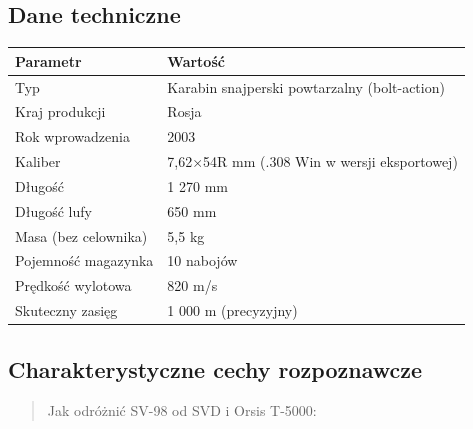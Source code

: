 \documentclass[12pt,oneside]{book}
\begin{document}
\subsection{Dane techniczne}\label{dane-techniczne-78}

\begin{longtable}[]{@{}ll@{}}
\toprule\noalign{}
Parametr & Wartość \\
\midrule\noalign{}
\endhead
\bottomrule\noalign{}
\endlastfoot
Typ & Karabin snajperski powtarzalny (bolt-action) \\
Kraj produkcji & Rosja \\
Rok wprowadzenia & 2003 \\
Kaliber & 7,62×54R mm (.308 Win w wersji eksportowej) \\
Długość & 1 270 mm \\
Długość lufy & 650 mm \\
Masa (bez celownika) & 5,5 kg \\
Pojemność magazynka & 10 nabojów \\
Prędkość wylotowa & 820 m/s \\
Skuteczny zasięg & 1 000 m (precyzyjny) \\
\end{longtable}

\subsection{Charakterystyczne cechy
rozpoznawcze}\label{charakterystyczne-cechy-rozpoznawcze-78}

\begin{quote}
Jak odróżnić SV-98 od SVD i Orsis T-5000:
\end{quote}
\end{document}
